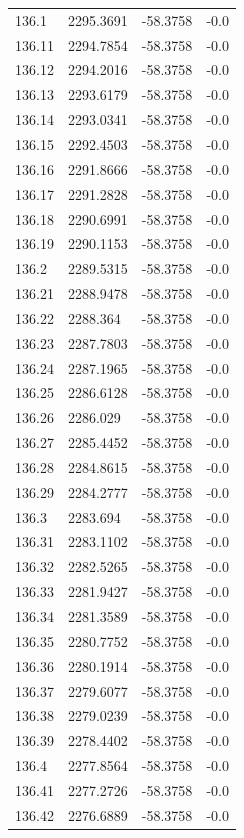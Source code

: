 \begin{table}[H]
\begin{tabular}{llll}
136.1 & 2295.3691 & -58.3758 & -0.0 \\
136.11 & 2294.7854 & -58.3758 & -0.0 \\
136.12 & 2294.2016 & -58.3758 & -0.0 \\
136.13 & 2293.6179 & -58.3758 & -0.0 \\
136.14 & 2293.0341 & -58.3758 & -0.0 \\
136.15 & 2292.4503 & -58.3758 & -0.0 \\
136.16 & 2291.8666 & -58.3758 & -0.0 \\
136.17 & 2291.2828 & -58.3758 & -0.0 \\
136.18 & 2290.6991 & -58.3758 & -0.0 \\
136.19 & 2290.1153 & -58.3758 & -0.0 \\
136.2 & 2289.5315 & -58.3758 & -0.0 \\
136.21 & 2288.9478 & -58.3758 & -0.0 \\
136.22 & 2288.364 & -58.3758 & -0.0 \\
136.23 & 2287.7803 & -58.3758 & -0.0 \\
136.24 & 2287.1965 & -58.3758 & -0.0 \\
136.25 & 2286.6128 & -58.3758 & -0.0 \\
136.26 & 2286.029 & -58.3758 & -0.0 \\
136.27 & 2285.4452 & -58.3758 & -0.0 \\
136.28 & 2284.8615 & -58.3758 & -0.0 \\
136.29 & 2284.2777 & -58.3758 & -0.0 \\
136.3 & 2283.694 & -58.3758 & -0.0 \\
136.31 & 2283.1102 & -58.3758 & -0.0 \\
136.32 & 2282.5265 & -58.3758 & -0.0 \\
136.33 & 2281.9427 & -58.3758 & -0.0 \\
136.34 & 2281.3589 & -58.3758 & -0.0 \\
136.35 & 2280.7752 & -58.3758 & -0.0 \\
136.36 & 2280.1914 & -58.3758 & -0.0 \\
136.37 & 2279.6077 & -58.3758 & -0.0 \\
136.38 & 2279.0239 & -58.3758 & -0.0 \\
136.39 & 2278.4402 & -58.3758 & -0.0 \\
136.4 & 2277.8564 & -58.3758 & -0.0 \\
136.41 & 2277.2726 & -58.3758 & -0.0 \\
136.42 & 2276.6889 & -58.3758 & -0.0 \\

\end{tabular}
\end{table}
